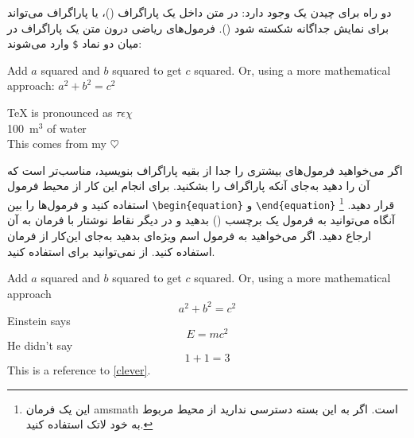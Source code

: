 دو راه برای چیدن یک  وجود دارد: در متن داخل یک پاراگراف 
()، 
یا پاراگراف می‌تواند برای نمایش جداگانه شکسته شود 
(). 
فرمول‌های ریاضی {\femph درون} 
متن  یک پاراگراف در میان دو نماد  \texttt{\$} وارد می‌شوند:

\begin{example}
Add $a$ squared and $b$ squared
to get $c$ squared. Or, using 
a more mathematical approach:
$a^2 + b^2 = c^2$
\end{example}
\begin{example}
\TeX{} is pronounced as 
$\tau\epsilon\chi$\\[5pt]
100~m$^{3}$ of water\\[5pt]
This comes from my $\heartsuit$
\end{example}

اگر می‌خواهید فرمول‌های بیشتری را جدا از بقیه پاراگراف بنویسید، مناسب‌تر است که آن را 
دهید به‌جای آنکه پاراگراف را بشکنید. برای انجام این کار از محیط فرمول استفاده کنید و فرمول‌ها را بین  \verb|\begin{equation}| و
\verb|\end{equation}| قرار دهید.%
\footnote{این یک فرمان \textsf{amsmath} است. اگر به این بسته دسترسی ندارید از محیط  مربوط به خود لاتک استفاده کنید.} 
آنگاه می‌توانید به فرمول یک برچسب () بدهید و در دیگر نقاط نوشتار‌ با فرمان   به آن ارجاع دهید. اگر می‌خواهید به فرمول اسم ویژه‌ای بدهید به‌جای این‌کار از فرمان  استفاده کنید. از  نمی‌توانید برای  استفاده کنید.

\begin{example}
Add $a$ squared and $b$ squared
to get $c$ squared. Or, using
a more mathematical approach
 \begin{equation}
   a^2 + b^2 = c^2
 \end{equation}
Einstein says
 \begin{equation}
   E = mc^2 \label{clever}
 \end{equation}
He didn't say
 \begin{equation}
  1 + 1 = 3 \tag{dumb}
 \end{equation}
This is a reference to 
\eqref{clever}. 
\end{example}


